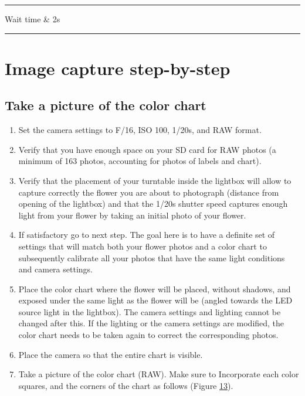 \documentclass[
]{book}
\theoremstyle{definition}
\theoremstyle{definition}
\theoremstyle{definition}
\theoremstyle{definition}
\theoremstyle{remark}
\begin{document}
\begin{center}\rule{0.5\linewidth}{0.5pt}\end{center}

Wait time \& 2s\\

\begin{center}\rule{0.5\linewidth}{0.5pt}\end{center}

\hypertarget{image-capture-step-by-step}{%
\chapter{Image capture step-by-step}\label{image-capture-step-by-step}}

\hypertarget{take-a-picture-of-the-color-chart}{%
\section{Take a picture of the color chart}\label{take-a-picture-of-the-color-chart}}

\begin{enumerate}
\def\labelenumi{\arabic{enumi}.}
\item
  Set the camera settings to F/16, ISO 100, 1/20s, and RAW format.
\item
  Verify that you have enough space on your SD card for RAW photos (a
  minimum of 163 photos, accounting for photos of labels and chart).
\item
  Verify that the placement of your turntable inside the lightbox will
  allow to capture correctly the flower you are about to photograph
  (distance from opening of the lightbox) and that the 1/20s shutter
  speed captures enough light from your flower by taking an initial
  photo of your flower.
\item
  If satisfactory go to next step. The goal here is to have a definite
  set of settings that will match both your flower photos and a color
  chart to subsequently calibrate all your photos that have the same
  light conditions and camera settings.
\item
  Place the color chart where the flower will be placed, without
  shadows, and exposed under the same light as the flower will be
  (angled towards the LED source light in the lightbox). The camera
  settings and lighting cannot be changed after this. If the lighting
  or the camera settings are modified, the color chart needs to be
  taken again to correct the corresponding photos.
\item
  Place the camera so that the entire chart is visible.
\item
  Take a picture of the color chart (RAW). Make sure to Incorporate
  each color squares, and the corners of the chart as follows (Figure
  \protect\hyperlink{colorchart}{13}).
\end{enumerate}
\end{document}
